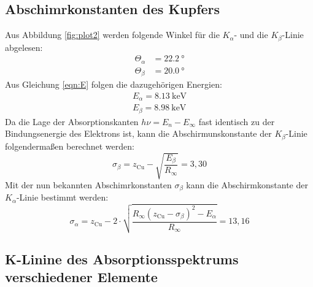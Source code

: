 \subsection{Abschimrkonstanten des Kupfers}

Aus Abbildung \ref{fig:plot2} werden folgende Winkel für die $K_\alpha$- und die $K_\beta$-Linie abgelesen:
\begin{align*}
  \Theta_\alpha &= \SI{22.2}{\degree} \\
  \Theta_\beta &= \SI{20.0}{\degree}
\end{align*}
Aus Gleichung \eqref{eqn:E} folgen die dazugehörigen Energien:
\begin{align*}
  E_\alpha = \SI{8.13}{\kilo\eV} \\
  E_\beta = \SI{8.98}{\kilo\eV}
\end{align*}
Da die Lage der Absorptionskanten $h\nu = E_n - E_\infty$ fast identisch zu der Bindungsenergie des Elektrons ist,
kann die Abschirmunskonstante der $K_\beta$-Linie folgendermaßen berechnet werden:
\begin{equation*}
  \sigma_\beta = z_\text{Cu} - \sqrt{\frac{E_\beta}{R_\infty}} = 3,30
\end{equation*}
Mit der nun bekannten Abschimrkonstanten $\sigma_\beta$ kann die Abschirmkonstante der $K_\alpha$-Linie bestimmt werden:
\begin{equation*}
  \sigma_\alpha = z_\text{Cu} - 2 \cdot \sqrt{\frac{R_\infty (z_\text{Cu}-\sigma_\beta)^2 - E_\alpha}{R_\infty}} = 13,16
\end{equation*}

\subsection{K-Linine des Absorptionsspektrums verschiedener Elemente}

